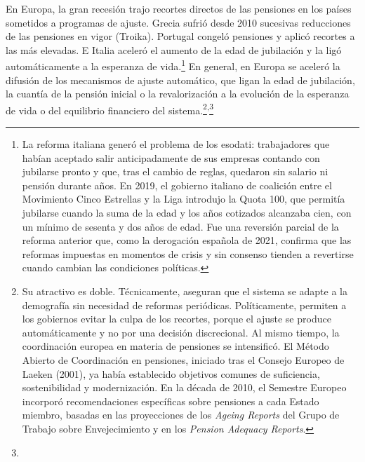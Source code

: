 \documentclass[10pt,a4paper]{article}
\begin{document}
En Europa, la gran recesión trajo recortes directos de las pensiones en los países sometidos a programas de ajuste. Grecia sufrió desde 2010 sucesivas reducciones de las pensiones en vigor (Troika). Portugal congeló pensiones y aplicó recortes a las más elevadas. E Italia aceleró el aumento de la edad de jubilación y la ligó automáticamente a la esperanza de vida.\footnote{%
    La reforma italiana generó el problema de los esodati: trabajadores que habían aceptado salir anticipadamente de sus empresas contando con jubilarse pronto y que, tras el cambio de reglas, quedaron sin salario ni pensión durante años. En 2019, el gobierno italiano de coalición entre el Movimiento Cinco Estrellas y la Liga introdujo la Quota 100, que permitía jubilarse cuando la suma de la edad y los años cotizados alcanzaba cien, con un mínimo de sesenta y dos años de edad. Fue una reversión parcial de la reforma anterior que, como la derogación española de 2021, confirma que las reformas impuestas en momentos de crisis y sin consenso tienden a revertirse cuando cambian las condiciones políticas.
} En general, en Europa se aceleró la difusión de los mecanismos de ajuste automático, que ligan la edad de jubilación, la cuantía de la pensión inicial o la revalorización a la evolución de la esperanza de vida o del equilibrio financiero del sistema.\footnote{%
    Su atractivo es doble. Técnicamente, aseguran que el sistema se adapte a la demografía sin necesidad de reformas periódicas. Políticamente, permiten a los gobiernos evitar la culpa de los recortes, porque el ajuste se produce automáticamente y no por una decisión discrecional. Al mismo tiempo, la coordinación europea en materia de pensiones se intensificó. El Método Abierto de Coordinación en pensiones, iniciado tras el Consejo Europeo de Laeken (2001), ya había establecido objetivos comunes de suficiencia, sostenibilidad y modernización. En la década de 2010, el Semestre Europeo incorporó recomendaciones específicas sobre pensiones a cada Estado miembro, basadas en las proyecciones de los \textit{Ageing Reports} del Grupo de Trabajo sobre Envejecimiento y en los \textit{Pension Adequacy Reports}.
}\textsuperscript{,}\footnote{%
}
\end{document}
